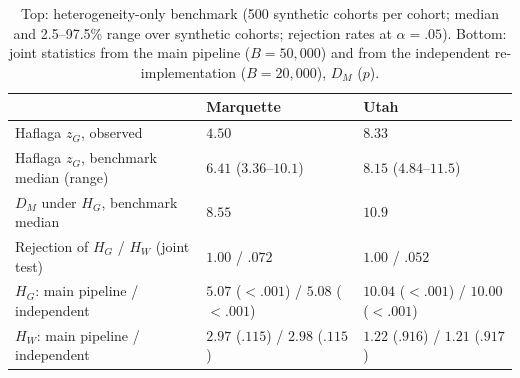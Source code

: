 \documentclass[12pt]{article}
\newcommand{\HG}{H_{G}}
\newcommand{\HW}{H_{W}}
\newcommand{\DM}{D_{M}}
\begin{document}
\begin{table}[!htbp]
\centering
\caption{Top: heterogeneity-only benchmark (500 synthetic cohorts per cohort; median and
  2.5--97.5\% range over synthetic cohorts; rejection rates at $\alpha = .05$). Bottom: joint
  statistics from the main pipeline ($B = 50{,}000$) and from the independent
  re-implementation ($B = 20{,}000$), $\DM$ ($p$).}
\label{tab:si-benchmark}
\smallskip
\small
\begin{tabular}{L{6.4cm} C{3.6cm} C{3.6cm}}
\toprule
 & \textbf{Marquette} & \textbf{Utah} \\
\midrule
Haflaga $z_G$, observed & $4.50$ & $8.33$ \\
Haflaga $z_G$, benchmark median (range) & $6.41$ ($3.36$--$10.1$) & $8.15$ ($4.84$--$11.5$) \\
$\DM$ under $\HG$, benchmark median & $8.55$ & $10.9$ \\
Rejection of $\HG$ / $\HW$ (joint test) & $1.00$ / $.072$ & $1.00$ / $.052$ \\
\midrule
$\HG$: main pipeline / independent & $5.07$ ($<.001$) / $5.08$ ($<.001$) & $10.04$ ($<.001$) / $10.00$ ($<.001$) \\
$\HW$: main pipeline / independent & $2.97$ ($.115$) / $2.98$ ($.115$) & $1.22$ ($.916$) / $1.21$ ($.917$) \\
\bottomrule
\end{tabular}
\end{table}
\end{document}
